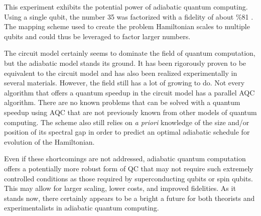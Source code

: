\documentclass[%
 reprint,
 amsmath,amssymb,
 aps,
]{revtex4-1}
\begin{document}
	This experiment exhibits the potential power of adiabatic quantum computing. Using a single qubit, the number 35 was factorized with a fidelity of about \%81 \cite{Xu2017}. The mapping scheme used to create the problem Hamiltonian scales to multiple qubits and could thus be leveraged to factor larger numbers.
	
	The circuit model certainly seems to dominate the field of quantum computation, but the adiabatic model stands its ground. It has been rigorously proven to be equivalent to the circuit model and has also been realized experimentally in several materials. However, the field still has a lot of growing to do. Not every algorithm that offers a quantum speedup in the circuit model has a parallel AQC algorithm. There are no known problems that can be solved with a quantum speedup using AQC that are not previously known from other models of quantum computing. The scheme also still relies on \textit{a priori} knowledge of the size and/or position of its spectral gap in order to predict an optimal adiabatic schedule for evolution of the Hamiltonian.
	
	Even if these shortcomings are not addressed, adiabatic quantum computation offers a potentially more robust form of QC that may not require such extremely controlled conditions as those required by superconducting qubits or spin qubits. This may allow for larger scaling, lower costs, and improved fidelities. As it stands now, there certainly appears to be a bright a future for both theorists and experimentalists in adiabatic quantum computing.
\end{document}
